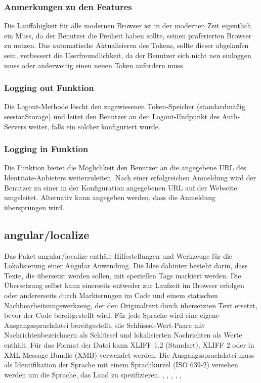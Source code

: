 \subsubsection{Anmerkungen zu den Features}
Die Lauffähigkeit für alle modernen Browser ist in der modernen Zeit eigentlich ein Muss, da der Benutzer die Freiheit
haben sollte, seinen präferierten Browser zu nutzen.
Das automatische Aktualisieren des Tokens, sollte dieser abgelaufen sein, verbessert die Userfreundlichkeit, 
da der Benutzer sich nicht neu einloggen muss oder anderweitig einen neuen Token anfordern muss.

\subsubsection{Logging out Funktion}
Die Logout-Methode löscht den zugewiesenen Token-Speicher (standardmäßig sessionStorage) und 
leitet den Benutzer an den Logout-Endpunkt des Auth-Servers weiter, falls ein solcher 
konfiguriert wurde.

\subsubsection{Logging in Funktion}
Die Funktion bietet die Möglichkeit den Benutzer an die angegebene URL des Identitäts-Anbieters weiterzuleiten.
Nach einer erfolgreichen Anmeldung wird der Benutzer zu einer in der Konfiguration angegebenen URL auf der Webseite umgeleitet.
Alternativ kann angegeben werden, dass die Anmeldung übersprungen wird.

\subsection{angular/localize}
Das Paket angular/localize enthält Hilfestellungen und Werkzeuge für die Lokalisierung einer Angular 
Anwendung. Die Idee dahinter besteht darin, dass Texte, die übersetzt werden sollen, mit 
speziellen Tags markiert werden. Die Übersetzung selbst kann einerseits entweder zur Laufzeit im Browser erfolgen oder
andererseits durch Markierungen im Code und einem statischen Nachbearbeitsungswerkzeug, der den Originaltext durch 
übersetzten Text ersetzt, bevor der Code bereitgestellt wird.
Für jede Sprache wird eine eigene Ausgangssprachdatei bereitgestellt, die Schlüssel-Wert-Paare mit Nachrichtenbezeichnern 
als Schlüssel und lokalisierten Nachrichten als Werte enthält.
Für das Format der Datei kann XLIFF 1.2 (Standart), XLIFF 2 oder in XML-Message Bundle (XMB) verwendet werden.
Die Ausgangssprachdatei muss als Identifikation der Sprache mit einem Sprachkürzel (ISO 639-2) versehen werden 
um die Sprache, das Land zu spezifizieren. 
\cite{noauthor_xml_2020}, \cite{noauthor_localization_nodate}, \cite{noauthor_angular_nodate-2}, \cite{noauthor_angular_nodate-3}, \cite{noauthor_angularlocalize_nodate}, \cite{noauthor_angular_nodate-4}

